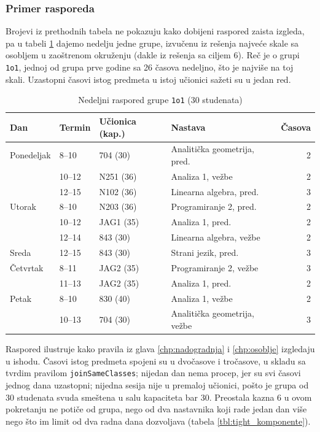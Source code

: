 \documentclass[12pt,oneside]{memoir}
\begin{document}
\subsubsection{Primer rasporeda}
\label{sec:primer_rasporeda}

Brojevi iz prethodnih tabela ne pokazuju kako dobijeni raspored zaista
izgleda, pa u tabeli \ref{tbl:primer_grupe} dajemo nedelju jedne grupe,
izvučenu iz rešenja najveće skale sa osobljem u zaoštrenom okruženju
(dakle iz rešenja sa ciljem 6). Reč je o grupi \texttt{1o1}, jednoj od
grupa prve godine sa 26 časova nedeljno, što je najviše na toj skali.
Uzastopni časovi istog predmeta u istoj učionici sažeti su u jedan red.

\begin{table}[ht]
\centering
\caption{Nedeljni raspored grupe \texttt{1o1} (30 studenata)}
\label{tbl:primer_grupe}
\begin{tabular}{llllr}
\toprule
\textbf{Dan} & \textbf{Termin} & \textbf{Učionica (kap.)}
& \textbf{Nastava} & \textbf{Časova} \\
\midrule
Ponedeljak & 8--10  & 704 (30)  & Analitička geometrija, pred. & 2 \\
           & 10--12 & N251 (36) & Analiza 1, vežbe             & 2 \\
           & 12--15 & N102 (36) & Linearna algebra, pred.      & 3 \\
\midrule
Utorak     & 8--10  & N203 (36) & Programiranje 2, pred.       & 2 \\
           & 10--12 & JAG1 (35) & Analiza 1, pred.             & 2 \\
           & 12--14 & 843 (30)  & Linearna algebra, vežbe      & 2 \\
\midrule
Sreda      & 12--15 & 843 (30)  & Strani jezik, pred.          & 3 \\
\midrule
Četvrtak   & 8--11  & JAG2 (35) & Programiranje 2, vežbe       & 3 \\
           & 11--13 & JAG2 (35) & Analiza 1, pred.             & 2 \\
\midrule
Petak      & 8--10  & 830 (40)  & Analiza 1, vežbe             & 2 \\
           & 10--13 & 704 (30)  & Analitička geometrija, vežbe & 3 \\
\bottomrule
\end{tabular}
\end{table}

Raspored ilustruje kako pravila iz glava \ref{chp:nadogradnja} i
\ref{chp:osoblje} izgledaju u ishodu. Časovi istog predmeta spojeni su u
dvočasove i tročasove, u skladu sa tvrdim pravilom
\texttt{joinSameClasses}; nijedan dan nema procep, jer su svi časovi
jednog dana uzastopni; nijedna sesija nije u premaloj učionici, pošto je
grupa od 30 studenata svuda smeštena u salu kapaciteta bar 30. Preostala
kazna 6 u ovom pokretanju ne potiče od grupa, nego od dva nastavnika
koji rade jedan dan više nego što im limit od dva radna dana dozvoljava
(tabela \ref{tbl:tight_komponente}).
\end{document}
